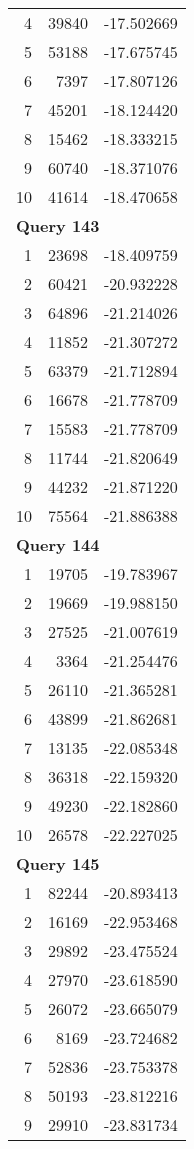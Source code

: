 \begin{longtable}[{p}]{@{}rrp{}@{}}
4 & 39840 & -17.502669 \\
5 & 53188 & -17.675745 \\
6 & 7397 & -17.807126 \\
7 & 45201 & -18.124420 \\
8 & 15462 & -18.333215 \\
9 & 60740 & -18.371076 \\
10 & 41614 & -18.470658 \\
\midrule
\multicolumn{3}{l}{\bfseries Query 143} \\
1 & 23698 & -18.409759 \\
2 & 60421 & -20.932228 \\
3 & 64896 & -21.214026 \\
4 & 11852 & -21.307272 \\
5 & 63379 & -21.712894 \\
6 & 16678 & -21.778709 \\
7 & 15583 & -21.778709 \\
8 & 11744 & -21.820649 \\
9 & 44232 & -21.871220 \\
10 & 75564 & -21.886388 \\
\midrule
\multicolumn{3}{l}{\bfseries Query 144} \\
1 & 19705 & -19.783967 \\
2 & 19669 & -19.988150 \\
3 & 27525 & -21.007619 \\
4 & 3364 & -21.254476 \\
5 & 26110 & -21.365281 \\
6 & 43899 & -21.862681 \\
7 & 13135 & -22.085348 \\
8 & 36318 & -22.159320 \\
9 & 49230 & -22.182860 \\
10 & 26578 & -22.227025 \\
\midrule
\multicolumn{3}{l}{\bfseries Query 145} \\
1 & 82244 & -20.893413 \\
2 & 16169 & -22.953468 \\
3 & 29892 & -23.475524 \\
4 & 27970 & -23.618590 \\
5 & 26072 & -23.665079 \\
6 & 8169 & -23.724682 \\
7 & 52836 & -23.753378 \\
8 & 50193 & -23.812216 \\
9 & 29910 & -23.831734 \\

\end{longtable}
